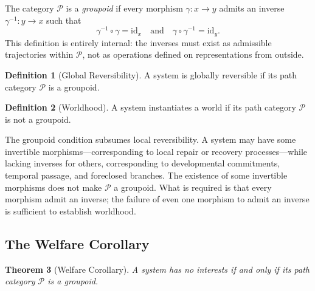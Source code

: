 \documentclass[11pt]{article}
\newtheorem{theorem}{Theorem}[section]
\theoremstyle{definition}
\newtheorem{definition}[theorem]{Definition}
\theoremstyle{remark}
\begin{document}
The category $\mathcal{P}$ is a \emph{groupoid} if every morphism $\gamma: x \to y$ admits
an inverse $\gamma^{-1}: y \to x$ such that
\[
\gamma^{-1} \circ \gamma = \mathrm{id}_x \quad \text{and} \quad
\gamma \circ \gamma^{-1} = \mathrm{id}_y.
\]
This definition is entirely internal: the inverses must exist as admissible trajectories
within $\mathcal{P}$, not as operations defined on representations from outside.

\begin{definition}[Global Reversibility]
A system is globally reversible if its path category $\mathcal{P}$ is a groupoid.
\end{definition}

\begin{definition}[Worldhood]
A system instantiates a world if its path category $\mathcal{P}$ is not a groupoid.
\end{definition}

The groupoid condition subsumes local reversibility. A system may have some invertible
morphisms---corresponding to local repair or recovery processes---while lacking inverses
for others, corresponding to developmental commitments, temporal passage, and foreclosed
branches. The existence of some invertible morphisms does not make $\mathcal{P}$ a groupoid.
What is required is that every morphism admit an inverse; the failure of even one morphism
to admit an inverse is sufficient to establish worldhood.

\subsection{The Welfare Corollary}

\begin{theorem}[Welfare Corollary]
A system has no interests if and only if its path category $\mathcal{P}$ is a groupoid.
\end{theorem}
\end{document}
